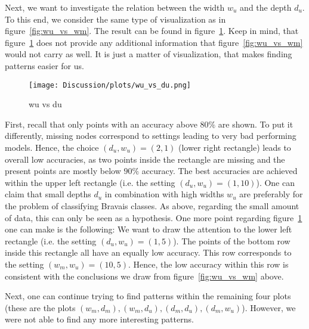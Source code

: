 Next, we want to investigate the relation between the width $w_u$ and the depth $d_u$.
To this end, we consider the same type of visualization as in figure~\ref{fig:wu_vs_wm}. The result can be found
in figure~\ref{fig:wu_vs_du}. Keep in mind, that figure~\ref{fig:wu_vs_du} does not provide any additional information
that figure~\ref{fig:wu_vs_wm} would not carry as well. It is just a matter of visualization, that makes finding patterns
easier for us.
\begin{figure}[h]
    \centering
    \texttt{[image: Discussion/plots/wu\_vs\_du.png]}
    \caption{wu vs du}
    \label{fig:wu_vs_du}
\end{figure}
First, recall that only points with an accuracy above $80\%$ are shown. 
To put it differently, missing nodes correspond to settings leading to very bad performing models.
Hence, the choice $(d_u,w_u)=(2, 1)$ (lower right rectangle) leads to overall low accuracies, as two points inside the 
rectangle are missing and the present points are mostly below $90\%$ accuracy.
The best accuracies are achieved within the upper left rectangle (i.e. the setting $(d_u,w_u)=(1,10)$).
One can claim that small depths $d_u$ in combination with high widths $w_u$ are preferably for the problem
of classifying Bravais classes. As above, regarding the small amount of data, this can only be seen as a hypothesis.
One more point regarding figure~\ref{fig:wu_vs_du} one can make is the following: 
We want to draw the attention to the lower left rectangle (i.e. the setting $(d_u,w_u)=(1,5)$).
The points of the bottom row inside this rectangle all have an equally low accuracy. 
This row corresponds to the setting $(w_m, w_u)=(10, 5)$. Hence, the low accuracy within this row
is consistent with the conclusions we draw from figure~\ref{fig:wu_vs_wm} above.

Next, one can continue trying to find patterns within the remaining four plots 
(these are the plots $(w_m,d_m),(w_m,d_u),(d_m,d_u),(d_m,w_u)$). However, we were not able
to find any more interesting patterns. 

%

